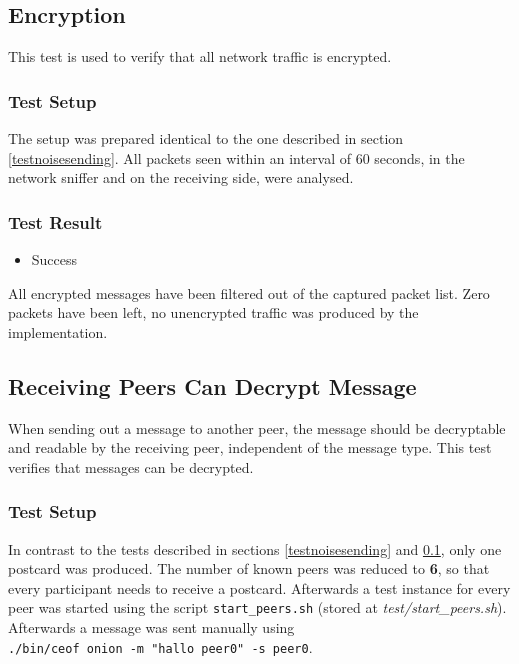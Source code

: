 \subsection{Encryption}
\label{testencryption}
This test is used to verify that all network traffic is encrypted.
\subsubsection{Test Setup}
The setup was prepared identical to the one described
in section \ref{testnoisesending}. All packets seen within
an interval of 60 seconds, in the network sniffer and on 
the receiving side, were analysed.
\subsubsection{Test Result}
\begin{itemize}
\item Success
\end{itemize}
All encrypted messages have been filtered out of the captured
packet list. Zero packets have been left, no unencrypted traffic
was produced by the implementation.
\subsection{Receiving Peers Can Decrypt Message}
When sending out a message to another peer, the message should
be decryptable and readable by the receiving peer, independent of the
message type. This test verifies that messages can be decrypted.
\subsubsection{Test Setup}
In contrast to the tests described in sections
\ref{testnoisesending} and \ref{testencryption}, only
one postcard was produced. The number of known peers was reduced
to \textbf{6}, so that every participant needs to receive a postcard.
Afterwards a test instance for every peer was started using
the script \verb=start_peers.sh=
(stored at \textit{test/start\_peers.sh}).
Afterwards a message was sent manually using
\\ \verb=./bin/ceof onion -m "hallo peer0" -s peer0=.

